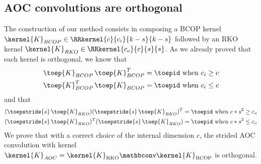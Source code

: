 
    \subsection{AOC convolutions are orthogonal}
\label{sec:ap_proof_aoc_ortho}
        The construction of our method consists in composing a BCOP kernel $ \kernel{K}_{BCOP} \in \RRkernel{c}{c_i}{k-s}{k-s} $ followed by an RKO kernel $ \kernel{K}_{RKO} \in \RRkernel{c_o}{c}{s}{s} $. As we already proved that each kernel is orthogonal, we know that 
        \begin{align*}
            \toep{K}_{BCOP} \, \toep{K}_{BCOP}^T = \toepid \text{ when } c_i \geq c \\
            \toep{K}_{BCOP}^T \, \toep{K}_{BCOP} = \toepid \text{ when } c_i \leq c
        \end{align*}
        and that 
        \begin{align*}
            (\toepstride{s} \, \toep{K}_{RKO})(\toepstride{s} \, \toep{K}_{RKO})^T = \toepid \text{ when } c*s^2 \geq c_o \\
            (\toepstride{s} \, \toep{K}_{RKO})^T(\toepstride{s} \, \toep{K}_{RKO}) = \toepid \text{ when } c*s^2 \leq c_o
        \end{align*}
    We prove that with a correct choice of the internal dimension $c$, the strided AOC convolution with kernel $\kernel{K}_{AOC}= \kernel{K}_{\text{RKO}} \mathbconv \kernel{K}_{\text{BCOP}}$ is orthogonal.
    
